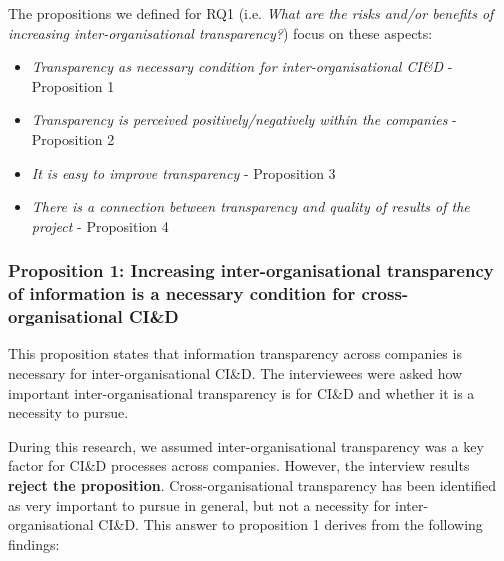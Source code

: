 The propositions we defined for  
RQ1 (i.e. {\em What are the risks and/or benefits of increasing inter-organisational transparency?}) focus on these aspects:

\begin{itemize}
\item {\em Transparency as necessary condition for  inter-organisational CI\&D} - Proposition 1 %
\item {\em Transparency is perceived positively/negatively within the companies} - Proposition 2 %
\item {\em It is easy to improve transparency} - Proposition 3 %
\item {\em There is a connection between transparency and quality of results of the project} - Proposition 4 %
\end{itemize}

\vspace{.2cm}
\subsubsection{Proposition 1: Increasing inter-organisational transparency of information is a necessary condition for cross-organisational CI\&D}

This proposition states that information transparency across companies is necessary for inter-organisational CI\&D. The interviewees were asked how important inter-organisational transparency is for CI\&D and whether it is a necessity to pursue. 

During this research, we assumed inter-organisational transparency was a key factor for CI\&D processes across companies. However, the interview results {\bf reject the proposition}. Cross-organisational transparency has been identified as very important to pursue in general, but not a necessity for inter-organisational CI\&D. This answer to proposition 1 derives from the following findings:

